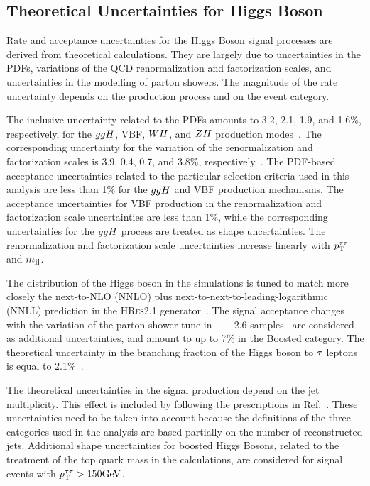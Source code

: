 \subsection{Theoretical Uncertainties for Higgs Boson}
Rate and acceptance uncertainties for the Higgs Boson signal processes are derived from theoretical calculations.
They are largely due to uncertainties in the PDFs, variations of the QCD renormalization and factorization scales,
and uncertainties in the modelling of parton showers.
The magnitude of the rate uncertainty depends on the production process and on the event category.

The inclusive uncertainty related to the PDFs amounts to 3.2, 2.1, 1.9, and 1.6\%, respectively, for 
the $ ggH $, VBF, $WH$, and $ZH$ production modes~\cite{deFlorian:2016spz}. The
corresponding uncertainty for the variation of the renormalization and factorization scales is 
3.9, 0.4, 0.7, and 3.8\%, respectively~\cite{deFlorian:2016spz}.
The PDF-based acceptance uncertainties related to the particular selection criteria used in this analysis are less 
than 1\% for the $ggH$ and VBF production mechanisms. The acceptance uncertainties for VBF production 
in the renormalization and factorization scale uncertainties are less than 1\%, while the corresponding 
uncertainties for the $ggH$ process are treated as shape uncertainties. The renormalization and 
factorization scale uncertainties increase linearly with $p_\mathrm{T}^{\tau\tau}$ and $m_\mathrm{jj}$.

The \pt distribution of the Higgs boson in the {} simulations is tuned to match more closely
the next-to-NLO (NNLO) plus next-to-next-to-leading-logarithmic (NNLL) prediction in the
\textsc{HRes2.1} generator~\cite{deFlorian:2012mx,Grazzini:2013mca}.
The signal acceptance changes with the variation of the parton shower tune in \HERWIG++ 2.6 samples~\cite{Bellm:2013hwb} 
are considered as additional uncertainties, and amount to up to 7\% in the Boosted category. The theoretical 
uncertainty in the branching fraction of the Higgs boson to $\tau$ leptons is equal to 2.1\%~\cite{deFlorian:2016spz}.

The theoretical uncertainties in the signal production depend on the jet multiplicity. This effect is included 
by following the prescriptions in Ref.~\cite{Stewart:2011cf}. These uncertainties need to be taken into account because 
the definitions of the three categories used in the analysis are based partially on the number of reconstructed 
jets. Additional shape uncertainties for boosted Higgs Bosons, related to the treatment of the top quark mass in 
the calculations, are considered for signal events with $p_\mathrm{T}^{\tau\tau}>150\mathrm{GeV}$.

